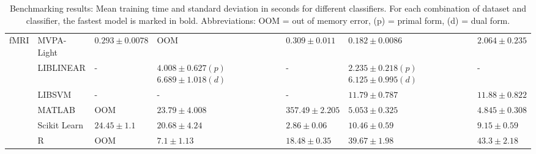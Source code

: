 \documentclass[utf8]{frontiersSCNS} %
\begin{document}
\begin{table}
\begin{tabular}{ |p{1.1cm}|p{1.4cm}|p{2cm}|p{2.1cm}|p{2cm}|p{2.1cm}|p{2cm}|}
  \hline
\multirow{6}{1.3cm}{fMRI} & MVPA-Light & $\mathbf{0.293}\pm0.0078$ & OOM & $\mathbf{0.309}\pm0.011$ & $\mathbf{0.182}\pm0.0086$ & $\mathbf{2.064}\pm0.235$\\
\cline{2-7}
  & LIBLINEAR & - & $\mathbf{4.008}\pm0.627(p)$ $6.689\pm1.018(d)$ & - & $2.235\pm0.218(p)$ $6.125\pm0.995(d)$ & - \\
\cline{2-7}
  & LIBSVM & - & - & - & $11.79\pm0.787$ & $11.88\pm0.822$ \\
\cline{2-7}
  & MATLAB & OOM & $23.79\pm4.008$ & $357.49\pm2.205$ & $5.053\pm0.325$ & $4.845\pm0.308$\\
\cline{2-7}
   & Scikit Learn & $24.45\pm1.1$ & $20.68\pm4.24$ & $2.86\pm0.06$ & $10.46\pm0.59$ & $9.15\pm0.59$\\
\cline{2-7}
  & R & OOM & $7.1\pm1.13$ & $18.48\pm0.35$ & $39.67\pm1.98$ & $43.3\pm2.18$ \\\hline
\end{tabular}
\caption{Benchmarking results: Mean training time and standard deviation in seconds for different classifiers. For each combination of dataset and classifier, the fastest model is marked in bold. Abbreviations: OOM = out of memory error, (p) = primal form, (d) = dual form.}
\label{tab:classification}
\end{table}
\end{document}
